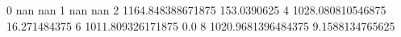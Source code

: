 0 nan nan
1 nan nan
2 1164.848388671875 153.0390625
4 1028.080810546875 16.271484375
6 1011.809326171875 0.0
8 1020.9681396484375 9.1588134765625
